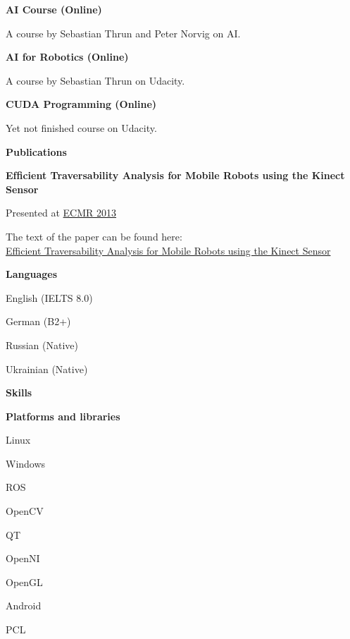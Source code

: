 \documentclass[a4paper,12pt,final]{memoir}
\newcommand{\Sep}{\vspace{1.5em}}
\newcommand{\SmallSep}{\vspace{0.5em}}
\newcommand{\CVSection}[1]
	{\Large\textbf{#1}\par
	\SmallSep\normalsize\normalfont}
\newcommand{\CVItem}[1]
	{\textbf{\color{MidnightBlue} #1}}
\begin{document}
\CVItem{AI Course (Online)}
\begin{compactitem}[\color{MidnightBlue}$\circ$]
	\item A course by Sebastian Thrun and Peter Norvig on AI.
\end{compactitem}
\SmallSep

\CVItem{AI for Robotics (Online)}
\begin{compactitem}[\color{MidnightBlue}$\circ$]
	\item A course by Sebastian Thrun on Udacity.
\end{compactitem}
\SmallSep

\CVItem{CUDA Programming (Online)}
\begin{compactitem}[\color{MidnightBlue}$\circ$]
	\item Yet not finished course on Udacity.
\end{compactitem}
\SmallSep

\CVSection{Publications}
\CVItem{Efﬁcient Traversability Analysis for Mobile Robots using the Kinect Sensor}
\begin{compactitem}[\color{MidnightBlue}$\circ$]
	\item Presented at \href{http://www.iri.upc.edu/ecmr13/#home}{ECMR 2013} 
	\item The text of the paper can be found here: \\\href{http://www.informatik.uni-freiburg.de/~stachnis/pdf/bogoslavskyi13ecmr.pdf}{Efficient Traversability Analysis for Mobile Robots using the Kinect Sensor} 
\end{compactitem}
\SmallSep

\CVSection{Languages}
\begin{compactitem}[\color{MidnightBlue}$\circ$]
	\item English (IELTS 8.0)
	\item German (B2+) 
	\item Russian (Native) 
	\item Ukrainian (Native)
\end{compactitem}
\Sep
\CVSection{Skills}
\CVItem{Platforms and libraries}
\begin{multicols}{3}
\begin{compactitem}[\color{MidnightBlue}$\circ$]
	\item Linux
	\item Windows
	\item ROS 
	\item OpenCV
	\item QT
	\item OpenNI 
	\item OpenGL
	\item Android
	\item PCL
\end{compactitem}
\end{multicols}
\SmallSep
\end{document}
